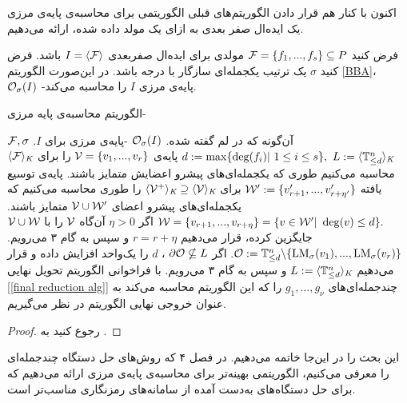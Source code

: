 اکنون با کنار هم قرار دادن الگوریتم‌های قبلی الگوریتمی برای محاسبه‌ی پایه‌ی مرزی یک ایده‌ال صفر بعدی به ازای یک مولد داده شده، ارائه می‌دهیم.

\begin{proposition}
فرض کنید 
${\mathcal F} = \{f_{1},...,f_{s}\}\subseteq P$
مولدی برای ایده‌ال صفربعدی 
$I = \langle{\mathcal F}\rangle$
باشد. فرض کنید 
$\sigma$
یک ترتیب یکجمله‌ای سازگار با درجه باشد. در این‌صورت الگوریتم 
\ref{BBA}، 
${\mathcal O}_{\sigma}(I)$
-پایه‌ی مرزی 
$I$
را محاسبه می‌کند.
\begin{algorithm}[t]
	\renewcommand{\algorithmicrequire}{\textbf{ورودی}}
	\renewcommand{\algorithmicensure}{\textbf{خروجی}}
	\caption{الگوریتم محاسبه‌ی پایه‌ مرزی-}
	\label{BBA}	
	\begin{algorithmic}[1]		
		\REQUIRE ${\mathcal F}, \sigma$
		آن‌گونه که در لم گفته شده.
		\ENSURE ${\mathcal O}_{\sigma}(I)$
		-پایه‌ی مرزی برای 
		$I$.
		\STATE $d:=\max\{\deg(f_{i})| \ 1\leq i\leq s\}, \ L:= \langle \tnd\rangle_{\fld}$
		\STATE پایه‌ی 
		${\mathcal V} = \{v_{1},...,v_{r}\}$		
		را برای 
		$\langle {\mathcal F}\rangle_{\textit{K}}$
		محاسبه می‌کنیم طوری که یکجمله‌ای‌های پیشرو اعضایش متمایز باشند.
		\STATE پایه‌ی توسیع یافته 
		${\mathcal W}' := \{v'_{r + 1},...,v'_{r+\eta'}\}$
		برای 
		$\langle{\mathcal V}^{+}\rangle_{\textit{K}}\supseteq\langle {\mathcal V}\rangle_{\textit{K}}$
		را طوری محاسبه می‌کنیم که یکجمله‌ای‌های پیشرو اعضای 
		${\mathcal V}\cup{\mathcal W}'$
		متمایز باشند.
		\STATE $\mW = \{v_{r+1},...,v_{r+\eta}\} = \{v\in\mW'| \ \deg(v)\leq d\}.$
		\STATE اگر 
		$\eta >0$
		آن‌گاه 
		${\mathcal V}$
		را با 
		${\mathcal V}\cup {\mathcal W}$
		جایگزین کرده، قرار می‌دهیم 
		$r = r + \eta$
		و سپس به گام ۳ می‌رویم. 
		\STATE ${\mathcal O}: = {\mathbb{T}}^{n}_{\leq d} \backslash \{\operatorname{\mathrm{LM}}_{\sigma}(v_{1}),...,\operatorname{\mathrm{LM}}_{\sigma}(v_{r})\}$.
		\STATE اگر 
		$\partial\mathcal{O} \nsubseteq	L$
		، 
		$d$
		را یک‌واحد افزایش داده و قرار می‌دهیم 
		$L:=\langle{\mathbb{T}}^{n}_{\leq d}\rangle_{\textit{K}}$ 
		و  سپس به گام ۳ می‌رویم. 
		\STATE با فراخوانی  الگوریتم تحویل نهایی
		[\ref{final reduction alg}]							
چندجمله‌ای‌های 
$g_{1},...,g_{\nu}$
را که این الگوریتم محاسبه می‌کند به عنوان خروجی نهایی الگوریتم در نظر می‌گیریم.
	\end{algorithmic}
\end{algorithm}
\end{proposition}
\begin{proof}
رجوع کنید به 
\cite{cca2_kreuzer}.
\end{proof}
این بحث را در این‌جا خاتمه می‌دهیم. در فصل ۴ که روش‌های حل دستگاه چندجمله‌ای را معرفی می‌کنیم، الگوریتمی بهینه‌تر برای محاسبه‌ی پایه‌ی مرزی ارائه می‌دهیم که برای حل دستگاه‌های به‌دست آمده از سامانه‌های رمزنگاری مناسب‌تر است. 



